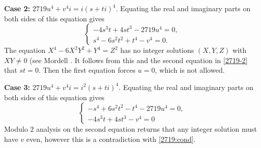 \documentclass[a4paper,12pt,english,reqno]{amsart}
\begin{document}
{\bf Case 2:}  $2719u^4+v^4i=i(s+ti)^4$. Equating the real and imaginary parts on both sides of this equation gives
\begin{equation}\label{2719-2}
\begin{cases}
-4s^3t + 4st^3 - 2719u^4=0,\\
s^4 - 6s^2t^2 + t^4 - v^4=0.
\end{cases}
\end{equation}
The equation $X^4-6X^2Y^2+Y^4=Z^2$ has no integer solutions $(X,Y,Z)$ with $XY\neq 0$ (see Mordell \cite[Theorem~3,page 18]{Mordell}. It follows from this and the second equation in \eqref{2719-2} that $st=0$. Then the first equation forces $u=0$, which is not allowed. 



{\bf Case 3:}  $2719u^4+v^4i=i^2(s+ti)^4$. Equating the real and imaginary parts on both sides of this equation gives
\begin{equation}\label{2719-3}
\begin{cases}
-s^4 + 6s^2t^2 - t^4 - 2719u^4=0,\\
-4s^3t + 4st^3 - v^4=0
\end{cases}
\end{equation}
Modulo $2$ analysis on the second equation returns that any integer solution must have $v$ even, however this is a contradiction with \eqref{2719:cond}.
\end{document}
